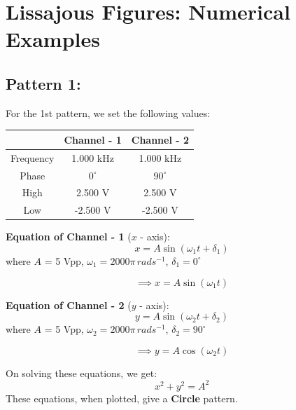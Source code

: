 \documentclass[12pt]{article}
\begin{document}
\section{Lissajous Figures: Numerical Examples}

\subsection{Pattern 1:}
For the 1st pattern, we set the following values:
\begin{table}[H]
    \centering
    \begin{tabular}{|c|c|c|}
    \hline
        & \textbf{Channel - 1} & \textbf{Channel - 2}\\
    \hline
    Frequency & 1.000 kHz & 1.000 kHz\\
    \hline
    Phase     & $0^{\circ}$ & $90^{\circ}$\\
    \hline
    High      & 2.500 V & 2.500 V\\
    \hline
    Low       & -2.500 V & -2.500 V\\
    \hline
    \end{tabular}
\end{table}

\textbf{Equation of Channel - 1} ($x$ - axis):
\[
x = A \sin{\left(\omega_1 t + \delta_1\right)}
\]
where $A$ = 5 Vpp, $\omega_1 = 2000 \pi \, rad s^{-1}$, $\delta_1 = 0^{\circ}$

\[
\implies x = A \sin{\left(\omega_1 t\right)}
\]

\textbf{Equation of Channel - 2} ($y$ - axis):
\[
y = A \sin{\left(\omega_2 t + \delta_2\right)}
\]
where $A$ = 5 Vpp, $\omega_2 = 2000 \pi \, rad s^{-1}$, $\delta_2 = 90^{\circ}$

\[
\implies y = A \cos{\left(\omega_2 t\right)}
\]

On solving these equations, we get:
\[
x^2 + y^2 = A^2
\]
These equations, when plotted, give a \textbf{Circle} pattern.
\end{document}
